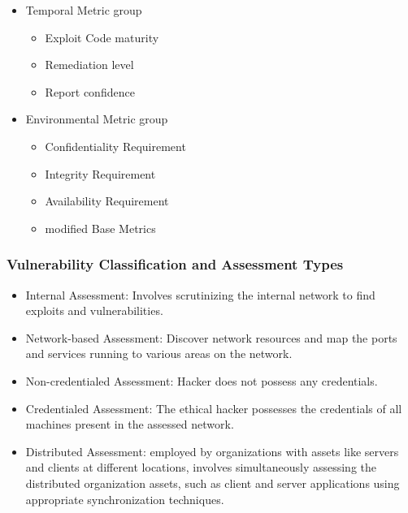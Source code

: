 \begin{itemize}
\begin{itemize}
\begin{itemize}
        \end{itemize}
    \end{itemize}
    \item Temporal Metric group
    \begin{itemize}
        \item Exploit Code maturity
        \item Remediation level
        \item Report confidence
    \end{itemize}
    \item Environmental Metric group
    \begin{itemize}
        \item Confidentiality Requirement
        \item Integrity Requirement
        \item Availability Requirement
        \item modified Base Metrics
    \end{itemize}
\end{itemize}

\subsubsection{Vulnerability Classification and Assessment Types}
\begin{itemize}
    \item Internal Assessment: Involves scrutinizing the internal network to find exploits and vulnerabilities.
    \item Network-based Assessment: Discover network resources and map the ports and services running to various areas on the network.
    \item Non-credentialed Assessment: Hacker does not possess any credentials.
    \item Credentialed Assessment: The ethical hacker possesses the credentials of all machines present in the assessed network.
    \item Distributed Assessment: employed by organizations with assets like servers and clients at different locations, involves simultaneously assessing the distributed organization assets, such as client and server applications using appropriate synchronization techniques.
\end{itemize}

